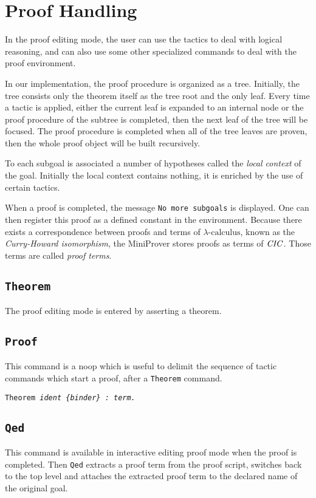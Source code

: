 \section{Proof Handling}

In the proof editing mode, the user can use the tactics to deal with logical reasoning,
and can also use some other specialized commands to deal with the proof environment.

In our implementation, the proof procedure is organized as a tree. Initially, the tree
consists only the theorem itself as the tree root and the only leaf.
Every time a tactic is applied, either
the current leaf is expanded to an internal node or the proof procedure of the subtree is completed, then the next leaf of the tree will be focused. The proof procedure is completed
when all of the tree leaves are proven, then the whole proof object will be built recursively.

To each subgoal is associated a number of hypotheses called the {\it local context} of the goal.
Initially the local context contains nothing, it is enriched by the use of certain tactics.

When a proof is completed, the message {\tt No more subgoals} is displayed. One can then register this
proof as a defined constant in the environment. Because there exists a correspondence between proofs and terms of
$\lambda\text{-calculus}$, known as the {\it Curry-Howard isomorphism}, the MiniProver stores proofs as terms of $\it CIC$.
Those terms are called {\it proof terms}.

\subsection{\tt Theorem}
The proof editing mode is entered by asserting a theorem.

\subsection{\tt Proof}
This command is a noop which is useful to delimit the sequence of tactic commands which start a proof, after a
{\tt Theorem} command.

{\tt Theorem \sl ident \{binder\} : term.}
\subsection{\tt Qed}
This command is available in interactive editing proof mode when the proof is completed.
Then {\tt Qed} extracts a proof term from the proof script, switches back to the top level and
attaches the extracted proof term to the declared name of the original goal.

